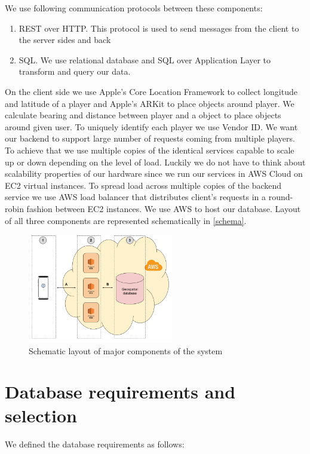 \documentclass[conference]{IEEEtran}
\begin{document}
We use following communication protocols between these components:

\begin{enumerate}[label=\Alph*]
\item REST over HTTP. This protocol is used to send messages from the client to the server sides and back
\item SQL. We use relational database and SQL over Application Layer to transform and query our data. 
\end{enumerate}

On the client side we use Apple’s Core Location Framework to collect longitude and latitude of a player and Apple’s ARKit to place objects around player. We calculate bearing and distance between player and a object to place objects around given user. To uniquely identify each player we use Vendor ID.
We want our backend to support large number of requests coming from multiple players. To achieve that we use multiple copies of the identical services capable to scale up or down depending on the level of load. Luckily we do not have to think about scalability properties of our hardware since we run our services in AWS Cloud on EC2 virtual instances.  To spread load across multiple copies of the backend service we use AWS load balancer that distributes client’s requests in a round-robin fashion between EC2 instances. 
We use AWS to host our database. 
Layout of all three components are represented schematically in \autoref{schema}. 

\begin{figure}
\centering
\includegraphics[width=2.5in]{imgs/systemschema.png}
\caption{Schematic layout of major components of the system}
\label{schema}
\end{figure}

\section{Database requirements and selection}

We defined the database requirements as follows:
\end{document}
